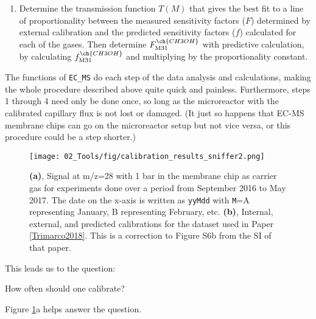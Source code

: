 \begin{enumerate}
	\item Determine the transmission function $T(M)$ that gives the best fit to a line of proportionality between the measured sensitivity factors ($F$) determined by external calibration and the predicted sensitivity factors ($f$) calculated for each of the gases. Then determine $F_\text{M31}^{\ch{CH3OH}}$ with predictive calculation, by calculating $f_\text{M31}^{\ch{CH3OH}}$ and multiplying by the proportionality constant.
\end{enumerate} The functions of \texttt{EC\_MS} do each step of the data analysis and calculations, making the whole procedure described above quite quick and painless. Furthermore, steps 1 through 4 need only be done once, so long as the microreactor with the calibrated capillary flux is not lost or damaged. (It just so happens that EC-MS membrane chips can go on the microreactor setup but not vice versa, or this procedure could be a step shorter.)
\begin{figure}[t]
	\texttt{[image: 02\_Tools/fig/calibration\_results\_sniffer2.png]}
	\caption{\textbf{(a)}, Signal at m/z=28 with 1 bar  in the membrane chip as carrier gas for experiments done over a period from September 2016 to May 2017. The date on the x-axis is written as \texttt{yyMdd} with \texttt{M}=A representing January, B representing February, etc. \textbf{(b)}, Internal, external, and predicted calibrations for the dataset used in Paper \ref{Trimarco2018}. This is a correction to Figure S6b from the SI of that paper.}
	\label{fig:CuNPs}
\end{figure}

This leads us to the question:
\begin{question}
	How often should one calibrate?
\end{question}
 Figure \ref{fig:CuNPs}a helps answer the question.

